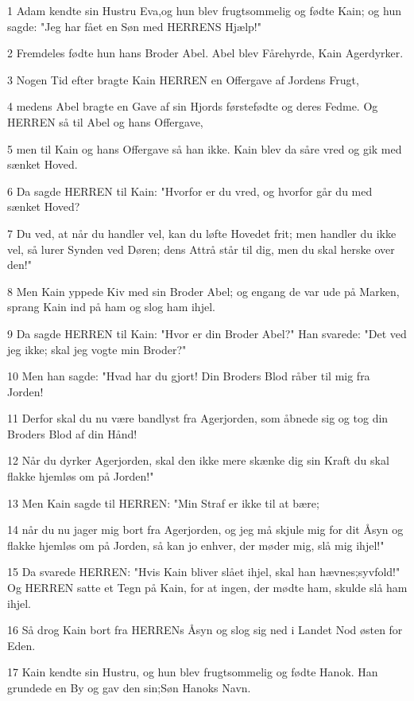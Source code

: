 \par 1 Adam kendte sin Hustru Eva,og hun blev frugtsommelig og fødte Kain; og hun sagde: "Jeg har fået en Søn med HERRENS Hjælp!"
\par 2 Fremdeles fødte hun hans Broder Abel. Abel blev Fårehyrde, Kain Agerdyrker.
\par 3 Nogen Tid efter bragte Kain HERREN en Offergave af Jordens Frugt,
\par 4 medens Abel bragte en Gave af sin Hjords førstefødte og deres Fedme. Og HERREN så til Abel og hans Offergave,
\par 5 men til Kain og hans Offergave så han ikke. Kain blev da såre vred og gik med sænket Hoved.
\par 6 Da sagde HERREN til Kain: "Hvorfor er du vred, og hvorfor går du med sænket Hoved?
\par 7 Du ved, at når du handler vel, kan du løfte Hovedet frit; men handler du ikke vel, så lurer Synden ved Døren; dens Attrå står til dig, men du skal herske over den!"
\par 8 Men Kain yppede Kiv med sin Broder Abel; og engang de var ude på Marken, sprang Kain ind på ham og slog ham ihjel.
\par 9 Da sagde HERREN til Kain: "Hvor er din Broder Abel?" Han svarede: "Det ved jeg ikke; skal jeg vogte min Broder?"
\par 10 Men han sagde: "Hvad har du gjort! Din Broders Blod råber til mig fra Jorden!
\par 11 Derfor skal du nu være bandlyst fra Agerjorden, som åbnede sig og tog din Broders Blod af din Hånd!
\par 12 Når du dyrker Agerjorden, skal den ikke mere skænke dig sin Kraft du skal flakke hjemløs om på Jorden!"
\par 13 Men Kain sagde til HERREN: "Min Straf er ikke til at bære;
\par 14 når du nu jager mig bort fra Agerjorden, og jeg må skjule mig for dit Åsyn og flakke hjemløs om på Jorden, så kan jo enhver, der møder mig, slå mig ihjel!"
\par 15 Da svarede HERREN: "Hvis Kain bliver slået ihjel, skal han hævnes;syvfold!" Og HERREN satte et Tegn på Kain, for at ingen, der mødte ham, skulde slå ham ihjel.
\par 16 Så drog Kain bort fra HERRENs Åsyn og slog sig ned i Landet Nod østen for Eden.
\par 17 Kain kendte sin Hustru, og hun blev frugtsommelig og fødte Hanok. Han grundede en By og gav den sin;Søn Hanoks Navn.
